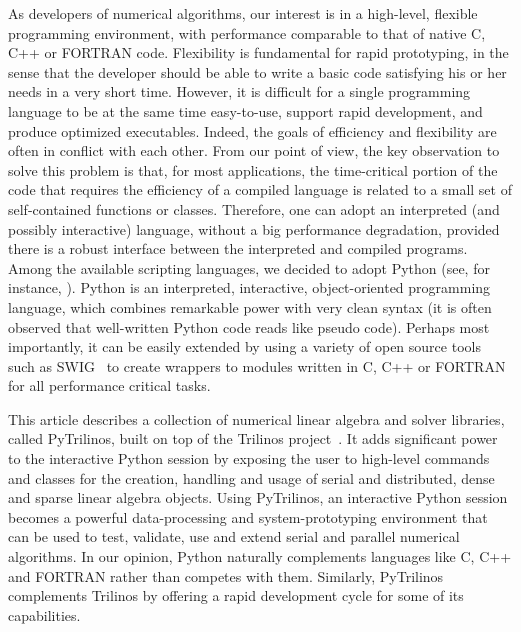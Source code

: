 \documentclass[acmtocl]{acmtrans2m}
\newcommand{\PyTrilinos}{{PyTrilinos}}
\begin{document}
As developers of numerical algorithms, our interest is in a
high-level, flexible programming environment, with performance
comparable to that of native C, C++ or FORTRAN code. Flexibility is
fundamental for rapid prototyping, in the sense that the developer
should be able to write a basic code satisfying his or her needs in a
very short time.  However, it is difficult for a single programming
language to be at the same time 
easy-to-use, support rapid development, and produce
optimized executables. Indeed, the goals of efficiency and flexibility
are often in conflict with each other. From our point of view, the key
observation to solve this problem is that, for most applications, the
time-critical portion of the code that requires the efficiency of a
compiled language is related to a small set of self-contained
functions or classes. Therefore, one can adopt an interpreted (and
possibly interactive) language, without a big performance degradation,
provided there is a robust interface between the interpreted and
compiled programs. Among the available scripting languages, we
decided to adopt Python (see, for instance, \cite{python-book}).
Python is an interpreted, interactive, object-oriented programming
language, which combines remarkable power with very clean syntax (it
is often observed that well-written Python code reads like pseudo
code).  Perhaps most importantly, it can be easily extended by using a
variety of open source tools such as SWIG~\cite{swig} to create
wrappers to modules written in C, C++ or FORTRAN for all performance
critical tasks.

This article describes a collection of numerical linear algebra and
solver libraries, called PyTrilinos, built on top of the Trilinos
project~\cite{Trilinos-home-page,Heroux:2005:OTP}.  It adds
significant power to the interactive Python session by exposing the
user to high-level commands and classes for the creation, handling and
usage of serial and distributed, dense and sparse linear algebra
objects. Using \PyTrilinos, an interactive Python session becomes a
powerful data-processing and system-prototyping environment that can
be used to test, validate, use and extend serial and parallel
numerical algorithms. In our opinion, Python naturally complements
languages like C, C++ and FORTRAN rather than competes with them.
Similarly, PyTrilinos complements Trilinos by offering a rapid
development cycle for some of its capabilities.

\end{document}
